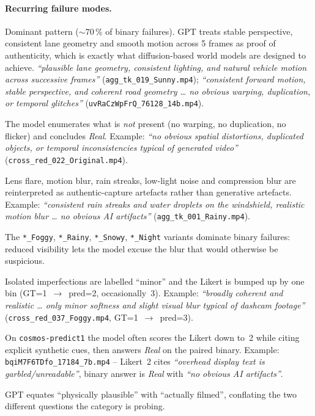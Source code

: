 \documentclass[11pt,a4paper]{article}
\newcommand{\code}[1]{\texttt{#1}}
\begin{document}
\paragraph{Recurring failure modes.}
\begin{description}[style=nextline]
  \item[Temporal-coherence trap.] Dominant pattern ($\sim$70\,\% of
  binary failures). GPT treats stable perspective, consistent lane
  geometry and smooth motion across 5 frames as proof of authenticity,
  which is exactly what diffusion-based world models are designed to
  achieve. \emph{``plausible lane geometry, consistent lighting, and
  natural vehicle motion across successive frames''}
  (\code{agg\_tk\_019\_Sunny.mp4}); \emph{``consistent forward motion,
  stable perspective, and coherent road geometry \ldots{} no obvious
  warping, duplication, or temporal glitches''}
  (\code{uvRaCzWpFrQ\_76128\_14b.mp4}).
  \item[Absence-of-artifact fallacy.] The model enumerates what is
  \emph{not} present (no warping, no duplication, no flicker) and
  concludes \emph{Real}. Example: \emph{``no obvious spatial distortions,
  duplicated objects, or temporal inconsistencies typical of generated
  video''} (\code{cross\_red\_022\_Original.mp4}).
  \item[Dashcam-aesthetic laundering.] Lens flare, motion blur, rain
  streaks, low-light noise and compression blur are reinterpreted as
  authentic-capture artefacts rather than generative artefacts.
  Example: \emph{``consistent rain streaks and water droplets on the
  windshield, realistic motion blur \ldots{} no obvious AI
  artifacts''} (\code{agg\_tk\_001\_Rainy.mp4}).
  \item[Weather/night cover.] The \code{*\_Foggy}, \code{*\_Rainy},
  \code{*\_Snowy}, \code{*\_Night} variants dominate binary failures:
  reduced visibility lets the model excuse the blur that would
  otherwise be suspicious.
  \item[Realism-score optimism.] Isolated imperfections are labelled
  ``minor'' and the Likert is bumped up by one bin
  (GT=1~$\to$~pred=2, occasionally~3). Example: \emph{``broadly
  coherent and realistic \ldots{} only minor softness and slight
  visual blur typical of dashcam footage''}
  (\code{cross\_red\_037\_Foggy.mp4}, GT=1~$\to$~pred=3).
  \item[Cross-question inconsistency.] On \code{cosmos-predict1} the
  model often scores the Likert down to~2 while citing explicit
  synthetic cues, then answers \emph{Real} on the paired binary.
  Example: \code{bqiM7F6TDfo\_17184\_7b.mp4} -- Likert~2 cites
  \emph{``overhead display text is garbled/unreadable''}, binary
  answer is \emph{Real} with \emph{``no obvious AI artifacts''}.
  \item[Plausibility-over-provenance.] GPT equates ``physically
  plausible'' with ``actually filmed'', conflating the two different
  questions the category is probing.
\end{description}
\end{document}
